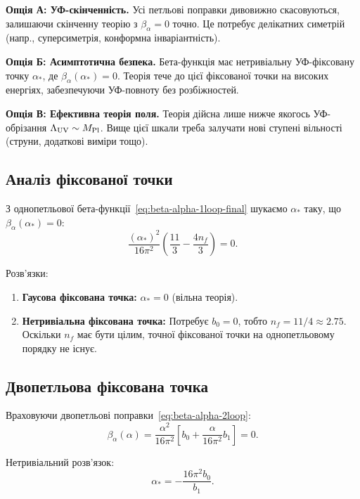 \documentclass[11pt,a4paper]{article}
\numberwithin{equation}{section}
\theoremstyle{plain}
\theoremstyle{definition}
\theoremstyle{remark}
\begin{document}
\textbf{Опція А: УФ-скінченність.} Усі петльові поправки дивовижно скасовуються, залишаючи скінченну теорію з $\beta_\alpha=0$ точно. Це потребує делікатних симетрій (напр., суперсиметрія, конформна інваріантність).

\textbf{Опція Б: Асимптотична безпека.} Бета-функція має нетривіальну УФ-фіксовану точку $\alpha_*$, де $\beta_\alpha(\alpha_*)=0$. Теорія тече до цієї фіксованої точки на високих енергіях, забезпечуючи УФ-повноту без розбіжностей.

\textbf{Опція В: Ефективна теорія поля.} Теорія дійсна лише нижче якогось УФ-обрізання $\Lambda_{\rm UV} \sim M_{\rm Pl}$. Вище цієї шкали треба залучати нові ступені вільності (струни, додаткові виміри тощо).

\subsection{Аналіз фіксованої точки}

З однопетльової бета-функції~\eqref{eq:beta-alpha-1loop-final} шукаємо $\alpha_*$ таку, що $\beta_\alpha(\alpha_*)=0$:
\begin{equation}
\frac{(\alpha_*)^2}{16\pi^2}\left(\frac{11}{3} - \frac{4n_f}{3}\right) = 0.
\label{eq:fixed-point-eqn}
\end{equation}

Розв'язки:
\begin{enumerate}
  \item \textbf{Гаусова фіксована точка:} $\alpha_*=0$ (вільна теорія).
  \item \textbf{Нетривіальна фіксована точка:} Потребує $b_0=0$, тобто $n_f = 11/4 \approx 2{.}75$. Оскільки $n_f$ має бути цілим, точної фіксованої точки на однопетльовому порядку не існує.
\end{enumerate}

\subsection{Двопетльова фіксована точка}

Враховуючи двопетльові поправки~\eqref{eq:beta-alpha-2loop}:
\begin{equation}
\beta_\alpha(\alpha) = \frac{\alpha^2}{16\pi^2}\left[b_0 + \frac{\alpha}{16\pi^2}b_1\right] = 0.
\label{eq:beta-2loop-fixed}
\end{equation}

Нетривіальний розв'язок:
\begin{equation}
\alpha_* = -\frac{16\pi^2 b_0}{b_1}.
\label{eq:alpha-star-2loop}
\end{equation}
\end{document}
